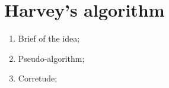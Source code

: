 \chapter{Harvey's algorithm}

\begin{enumerate}
    \item Brief of the idea;
    \item Pseudo-algorithm;
    \item Corretude;
\end{enumerate}